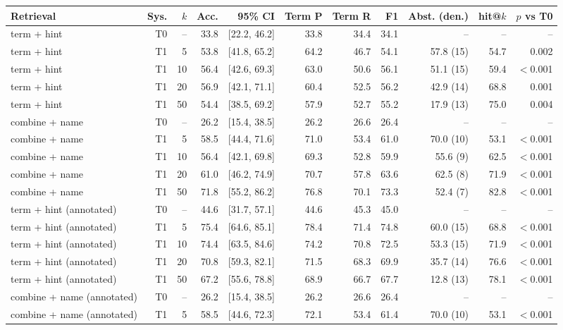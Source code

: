 \begin{table}[t]
\centering
\small
\begin{tabular}{lrrrrrrrrrr}
\toprule
Retrieval & Sys. & $k$ & Acc. & 95\% CI & Term P & Term R & F1 & Abst. (den.) & hit@$k$ & $p$ vs T0 \\
\midrule
term + hint & T0 & -- & 33.8 & [22.2, 46.2] & 33.8 & 34.4 & 34.1 & -- & -- & -- \\
term + hint & T1 & 5 & 53.8 & [41.8, 65.2] & 64.2 & 46.7 & 54.1 & 57.8 (15) & 54.7 & 0.002 \\
term + hint & T1 & 10 & 56.4 & [42.6, 69.3] & 63.0 & 50.6 & 56.1 & 51.1 (15) & 59.4 & $<$0.001 \\
term + hint & T1 & 20 & 56.9 & [42.1, 71.1] & 60.4 & 52.5 & 56.2 & 42.9 (14) & 68.8 & 0.001 \\
term + hint & T1 & 50 & 54.4 & [38.5, 69.2] & 57.9 & 52.7 & 55.2 & 17.9 (13) & 75.0 & 0.004 \\
combine + name & T0 & -- & 26.2 & [15.4, 38.5] & 26.2 & 26.6 & 26.4 & -- & -- & -- \\
combine + name & T1 & 5 & 58.5 & [44.4, 71.6] & 71.0 & 53.4 & 61.0 & 70.0 (10) & 53.1 & $<$0.001 \\
combine + name & T1 & 10 & 56.4 & [42.1, 69.8] & 69.3 & 52.8 & 59.9 & 55.6 (9) & 62.5 & $<$0.001 \\
combine + name & T1 & 20 & 61.0 & [46.2, 74.9] & 70.7 & 57.8 & 63.6 & 62.5 (8) & 71.9 & $<$0.001 \\
combine + name & T1 & 50 & 71.8 & [55.2, 86.2] & 76.8 & 70.1 & 73.3 & 52.4 (7) & 82.8 & $<$0.001 \\
term + hint (annotated) & T0 & -- & 44.6 & [31.7, 57.1] & 44.6 & 45.3 & 45.0 & -- & -- & -- \\
term + hint (annotated) & T1 & 5 & 75.4 & [64.6, 85.1] & 78.4 & 71.4 & 74.8 & 60.0 (15) & 68.8 & $<$0.001 \\
term + hint (annotated) & T1 & 10 & 74.4 & [63.5, 84.6] & 74.2 & 70.8 & 72.5 & 53.3 (15) & 71.9 & $<$0.001 \\
term + hint (annotated) & T1 & 20 & 70.8 & [59.3, 82.1] & 71.5 & 68.3 & 69.9 & 35.7 (14) & 76.6 & $<$0.001 \\
term + hint (annotated) & T1 & 50 & 67.2 & [55.6, 78.8] & 68.9 & 66.7 & 67.7 & 12.8 (13) & 78.1 & $<$0.001 \\
combine + name (annotated) & T0 & -- & 26.2 & [15.4, 38.5] & 26.2 & 26.6 & 26.4 & -- & -- & -- \\
combine + name (annotated) & T1 & 5 & 58.5 & [44.6, 72.3] & 72.1 & 53.4 & 61.4 & 70.0 (10) & 53.1 & $<$0.001 \\

\end{tabular}
\end{table}
